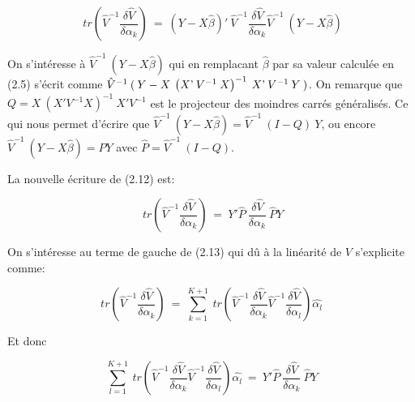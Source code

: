 \documentclass[11pt,fleqn]{book} %
\begin{document}
\begin{equation}
 \: tr\left( \hat{V}^{-1} \frac{ \delta \hat{V} }{\delta \alpha_k} \right)  \:=\: (Y-X\hat{\beta})'\:\hat{V}^{-1} \frac{ \delta \hat{V} }{\delta \alpha_k} \hat{V}^{-1}\:(Y-X\hat{\beta}) 
\end{equation}

\vspace{1em}

On s'intéresse à $\hat{V}^{-1}\:(Y-X\hat{\beta})$ qui en remplacant $\hat{\beta}$ par sa valeur calculée en (2.5) s'écrit comme $\hat{V}^{-1}\:(\: Y-X\:\left(  X\textnormal{'}\:V^{-1} \: X \right)^{-1} \: X\textnormal{'} \:V^{-1}\: Y \:)$. On remarque que $Q=X\:(X'V^{-1}X)^{-1}\:X' V^{-1}$ est le projecteur des moindres carrés généralisés. Ce qui nous permet d'écrire que $\hat{V}^{-1}\:(Y-X\hat{\beta})=\hat{V}^{-1}\:(I-Q)\:Y $, ou encore $\hat{V}^{-1}\:(Y-X\hat{\beta})=\hat{P}Y$ avec $\hat{P}=\hat{V}^{-1}\:(I-Q)$.

\vspace{1em}

La nouvelle écriture de (2.12) est:

\begin{equation}
 \: tr\left( \hat{V}^{-1} \frac{ \delta \hat{V} }{\delta \alpha_k} \right)  \:=\: Y'\hat{P}\:\frac{ \delta \hat{V} }{\delta \alpha_k}\: \hat{P} Y
\end{equation}

\vspace{1em}

On s'intéresse au terme de gauche de (2.13) qui dû à la linéarité de $V$ s'explicite comme:

\begin{equation*}
tr\left( \hat{V}^{-1} \frac{ \delta \hat{V} }{\delta \alpha_k} \right) \:=\: \sum_{k=1}^{K+1} \: tr\left(\hat{V}^{-1} \frac{ \delta \hat{V} }{\delta \alpha_k}  \hat{V}^{-1} \frac{ \delta \hat{V} }{\delta \alpha_l}\right) \hat{\alpha_l}
\end{equation*}

\vspace{1em}

Et donc

\begin{equation*}
\sum_{l=1}^{K+1} \: tr\left(\hat{V}^{-1} \frac{ \delta \hat{V} }{\delta \alpha_k}  \hat{V}^{-1} \frac{ \delta \hat{V} }{\delta \alpha_l}\right) \hat{\alpha_l} \:=\: Y'\hat{P}\:\frac{ \delta \hat{V} }{\delta \alpha_k}\: \hat{P} Y
\end{equation*}
\end{document}
